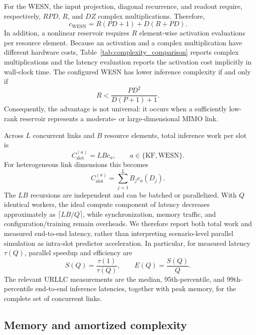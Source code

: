 \documentclass[lettersize,journal]{IEEEtran}
\begin{document}
For the WESN, the input projection, diagonal recurrence, and readout require,
respectively, $RPD$, $R$, and $DZ$ complex multiplications.  Therefore,
\begin{equation}
 c_{\mathrm{WESN}}
 =R(PD+1)+D(R+PD).
 \label{eq:wesn_inference_cost}
\end{equation}
In addition, a nonlinear reservoir requires $R$ element-wise activation
evaluations per resource element.  Because an activation and a complex
multiplication have different hardware costs, Table~\ref{tab:complexity_comparison}
reports complex multiplications and the latency evaluation reports the
activation cost implicitly in wall-clock time.
The configured WESN has lower inference complexity if and only if
\begin{equation}
 R < \frac{PD^2}{D(P+1)+1}.
 \label{eq:wesn_break_even}
\end{equation}
Consequently, the advantage is not universal: it occurs when a sufficiently
low-rank reservoir represents a moderate- or large-dimensional MIMO link.

Across $L$ concurrent links and $B$ resource elements, total inference work
per slot is
\begin{equation}
C_{\mathrm{slot}}^{(a)}=LBc_a,
 \qquad a\in\{\mathrm{KF},\mathrm{WESN}\}.
 \label{eq:system_inference_cost}
\end{equation}
For heterogeneous link dimensions this becomes
\begin{equation}
 C_{\mathrm{slot}}^{(a)}
 =\sum_{j=1}^{L}B_jc_a(D_j).
\end{equation}
The $LB$ recursions are independent and can be batched or parallelized.  With
$Q$ identical workers, the ideal compute component of latency decreases
approximately as $\lceil LB/Q\rceil$, while synchronization, memory traffic,
and configuration/training remain overheads.  We therefore report both total
work and measured end-to-end latency, rather than interpreting scenario-level
parallel simulation as intra-slot predictor acceleration.  In particular,
for measured latency $\tau(Q)$, parallel speedup and efficiency are
\begin{equation}
 S(Q)=\frac{\tau(1)}{\tau(Q)},\qquad
 E(Q)=\frac{S(Q)}{Q}.
\end{equation}
The relevant URLLC measurements are the median, 95th-percentile, and
99th-percentile end-to-end inference latencies, together with peak memory,
for the complete set of concurrent links.

\subsection{Memory and amortized complexity}
\end{document}
